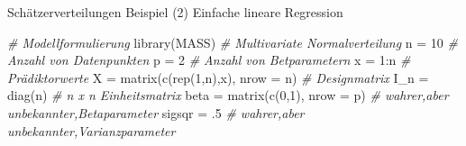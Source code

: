 \documentclass[
  8pt,
  ignorenonframetext,
]{beamer}
\newenvironment{Shaded}{\begin{snugshade}}{\end{snugshade}}
\newcommand{\AttributeTok}[1]{\textcolor[rgb]{0.77,0.63,0.00}{#1}}
\newcommand{\CommentTok}[1]{\textcolor[rgb]{0.56,0.35,0.01}{\textit{#1}}}
\newcommand{\DecValTok}[1]{\textcolor[rgb]{0.00,0.00,0.81}{#1}}
\newcommand{\FunctionTok}[1]{\textcolor[rgb]{0.00,0.00,0.00}{#1}}
\newcommand{\NormalTok}[1]{#1}
\newcommand{\OtherTok}[1]{\textcolor[rgb]{0.56,0.35,0.01}{#1}}
\newcommand{\SpecialCharTok}[1]{\textcolor[rgb]{0.00,0.00,0.00}{#1}}
\begin{document}
\begin{frame}[fragile]{Schätzerverteilungen}
\protect\hypertarget{schuxe4tzerverteilungen-2}{}
Beispiel (2) Einfache lineare Regression \vspace{1mm} 
\footnotesize

\begin{Shaded}
\begin{Highlighting}[]
\CommentTok{\# Modellformulierung}
\FunctionTok{library}\NormalTok{(MASS)                                         }\CommentTok{\# Multivariate Normalverteilung}
\NormalTok{n        }\OtherTok{=} \DecValTok{10}                                         \CommentTok{\# Anzahl von Datenpunkten}
\NormalTok{p        }\OtherTok{=} \DecValTok{2}                                          \CommentTok{\# Anzahl von Betparametern}
\NormalTok{x        }\OtherTok{=} \DecValTok{1}\SpecialCharTok{:}\NormalTok{n                                        }\CommentTok{\# Prädiktorwerte}
\NormalTok{X        }\OtherTok{=} \FunctionTok{matrix}\NormalTok{(}\FunctionTok{c}\NormalTok{(}\FunctionTok{rep}\NormalTok{(}\DecValTok{1}\NormalTok{,n),x), }\AttributeTok{nrow =}\NormalTok{ n)            }\CommentTok{\# Designmatrix}
\NormalTok{I\_n      }\OtherTok{=} \FunctionTok{diag}\NormalTok{(n)                                    }\CommentTok{\# n x n Einheitsmatrix}
\NormalTok{beta     }\OtherTok{=} \FunctionTok{matrix}\NormalTok{(}\FunctionTok{c}\NormalTok{(}\DecValTok{0}\NormalTok{,}\DecValTok{1}\NormalTok{), }\AttributeTok{nrow =}\NormalTok{ p)                   }\CommentTok{\# wahrer,aber unbekannter,Betaparameter}
\NormalTok{sigsqr   }\OtherTok{=}\NormalTok{ .}\DecValTok{5}                                         \CommentTok{\# wahrer,aber unbekannter,Varianzparameter}


\end{Highlighting}
\end{Shaded}
\end{frame}
\end{document}
